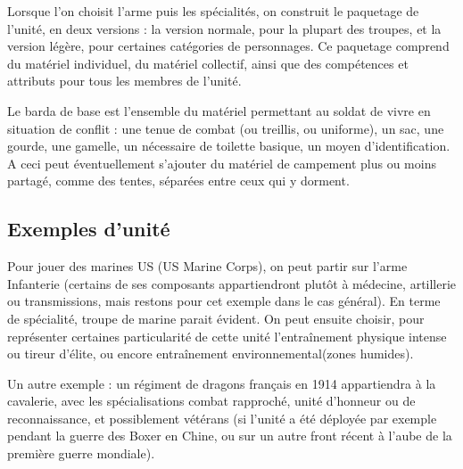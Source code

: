 \documentclass{report}
\begin{document}
\begin{multicols}{2}
Lorsque l'on choisit l'arme puis les spécialités, on construit le paquetage de l'unité, en deux versions : la version normale, pour la plupart des troupes, et la version légère, pour certaines catégories de personnages. Ce paquetage comprend du matériel individuel, du matériel collectif, ainsi que des compétences et attributs pour tous les membres de l'unité.

Le barda de base est l'ensemble du matériel permettant au soldat de vivre en situation de conflit : une tenue de combat (ou treillis, ou uniforme), un sac, une gourde, une gamelle, un nécessaire de toilette basique, un moyen d'identification. A ceci peut éventuellement s'ajouter du matériel de campement plus ou moins partagé, comme des tentes, séparées entre ceux qui y dorment.

\subsection{Exemples d'unité}
Pour jouer des marines US (US Marine Corps), on peut partir sur l'arme Infanterie (certains de ses composants appartiendront plutôt à médecine, artillerie ou transmissions, mais restons pour cet exemple dans le cas général). En terme de spécialité, troupe de marine parait évident. On peut ensuite choisir, pour représenter certaines particularité de cette unité l'entraînement physique intense ou tireur d'élite, ou encore entraînement environnemental(zones humides). 


Un autre exemple : un régiment de dragons français en 1914 appartiendra à la cavalerie, avec les spécialisations combat rapproché, unité d'honneur ou de reconnaissance, et possiblement vétérans (si l'unité a été déployée par exemple pendant la guerre des Boxer en Chine, ou sur un autre front récent à l'aube de la première guerre mondiale).

\end{multicols}
\end{document}
